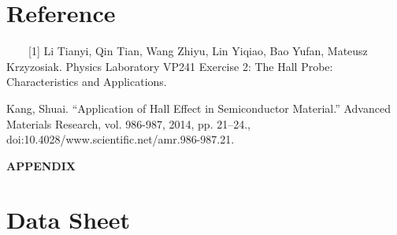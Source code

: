 \documentclass[12pt,a4paper]{article}
\begin{document}
\section{Reference} 
~~~~[1] Li Tianyi, Qin Tian, Wang Zhiyu, Lin Yiqiao, Bao Yufan, Mateusz Krzyzosiak. Physics Laboratory VP241 Exercise 2: The Hall Probe: Characteristics and Applications. \par
[2] Kang, Shuai. “Application of Hall Effect in Semiconductor Material.” Advanced Materials Research, vol. 986-987, 2014, pp. 21–24., doi:10.4028/www.scientific.net/amr.986-987.21. 

\begin{description}
    \item[]   
\end{description}

{\LARGE\textbf{APPENDIX}}
\setcounter{section}{0}
\renewcommand\thesection{\Alph{section}}
\section{Data Sheet}
\end{document}
